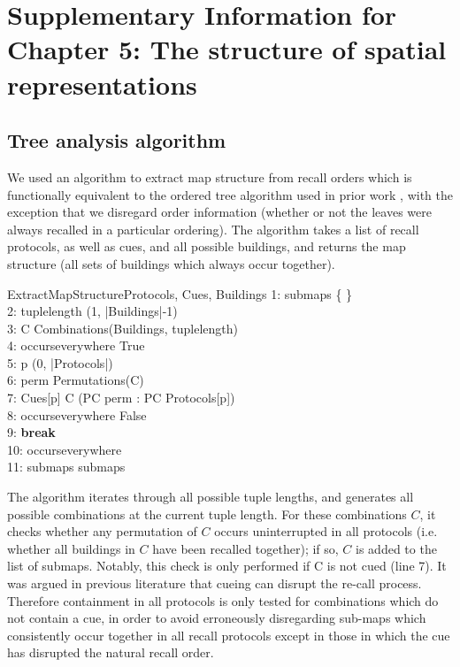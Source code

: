 \chapter{Supplementary Information for Chapter 5: The structure of spatial representations}
\label{apx:mapstruture}

\section{Tree analysis algorithm}

We used an algorithm to extract map structure from recall orders which is functionally equivalent to the ordered tree algorithm used in prior work \citep{Hirtle_Jonides_1985, mcnamara1986mental, mcnamara1989subjective}, with the exception that we disregard order information (whether or not the leaves were always recalled in a particular ordering). The algorithm takes a list of recall protocols, as well as cues, and all possible buildings, and returns the map structure (all sets of buildings which always occur together).

\begin{pseudocode}[ruled]{ExtractMapStructure}{Protocols, Cues, Buildings}
	1: submaps \GETS \{ \} \\
	2: \FOREACH tuplelength \in (1, |Buildings|-1) \\
	3: \quad \FOREACH C \in Combinations(Buildings, tuplelength) \\
	4: \quad\quad occurseverywhere \GETS True \\
	5: \quad\quad \FOREACH p \in (0, |Protocols|) \\
	6: \quad\quad\quad perm \GETS Permutations(C) \\
	7: \quad\quad\quad \IF Cues[p] \notin C \AND \forall (PC \in perm : PC \notin Protocols[p]) \\
	8: \quad\quad\quad\quad occurseverywhere \GETS False \\
	9: \quad\quad\quad\quad \textbf{break} \\
	10: \quad\quad \IF occurseverywhere \\
	11: \quad\quad\quad submaps \GETS submaps 
\end{pseudocode}

The algorithm iterates through all possible tuple lengths, and generates all possible combinations at the current tuple length. For these combinations $C$, it checks whether any permutation of $C$ occurs uninterrupted in all protocols (i.e. whether all buildings in $C$ have been recalled together); if so, $C$ is added to the list of submaps. Notably, this check is only performed if C is not cued (line 7). It was argued in previous literature \citep{Hirtle_Jonides_1985, mcnamara1989subjective} that cueing can disrupt the re-call process. Therefore containment in all protocols is only tested for combinations which do not contain a cue, in order to avoid erroneously disregarding sub-maps which consistently occur together in all recall protocols except in those in which the cue has disrupted the natural recall order.

